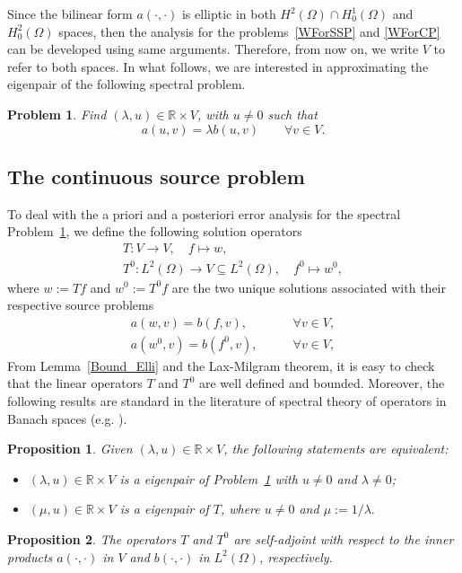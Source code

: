\documentclass[final,reqno]{elsarticle}
\newtheorem{proposition}{Proposition}[section]
\newtheorem{problem}{Problem}
\def\R{\mathbb{R}}
\def\R{\mathbb{R}}
\newcommand{\aer}[1]{{\leavevmode\color{magenta}{#1}}}
\begin{document}
Since the bilinear form $a(\cdot,\cdot)$ is elliptic in both $H^2(\Omega)\cap H_0^1(\Omega)$ and $H_0^2(\Omega)$ spaces, then the analysis for the  problems~\eqref{WForSSP} and \eqref{WForCP} can be developed using same arguments. Therefore, from now on, we write $V$ to refer to both spaces. In what follows, we are interested in approximating the eigenpair of the following spectral problem.
%
%
\begin{problem}\label{WMPr} 
Find $(\lambda,u)\in \mathbb{R}\times V$, with $u\neq 0$ such that
\begin{equation*}
    a(u,v)=\lambda b(u,v)\qquad \forall v\in V.
\end{equation*}
\end{problem}
%
\subsection{The continuous source problem}\label{sec:contSolOp}
To deal with the a priori and a posteriori error analysis for the spectral  Problem~\ref{WMPr}, we define the following solution operators 
\begin{gather*}
T:V \rightarrow  V,
\quad  f \longmapsto w,\\
T^0:L^2(\Omega) \rightarrow  V\subseteq L^2(\Omega),
\quad f^0 \longmapsto w^0,
\end{gather*}
%
%
where $w:=Tf$ and $w^0:=T^0f$ are the two  unique solutions associated with their respective source problems
\begin{align}
a( w ,v)=b(f,v),\qquad&\forall v\in V,    \label{ContSourGPr}\\
a( w^0 ,v)=b(f^0,v),\qquad&\forall v\in V, \label{ContSourGPr0}
\end{align}
From Lemma~\ref{Bound_Elli} and the Lax-Milgram theorem, it is easy to check that the linear operators $T$ and $T^0$ are well defined and bounded. Moreover, the following results are standard in the literature of spectral theory of operators in Banach spaces (e.g. \cite{BO}).
\begin{proposition}
Given $(\lambda,u)\in\R\times V$, the following statements are equivalent:
\begin{itemize}
\item $(\lambda,u)\in\R\times V$ is a eigenpair of Problem~\ref{WMPr} with $u\neq 0$ and $\lambda\neq 0$;
\item $(\mu, u)\in\R\times V$ is a eigenpair of $T$, where $u\neq 0$ and $\mu:=1/\lambda.$
\end{itemize}
\end{proposition}
%
%
\begin{proposition}
The operators $T$ and $T^0$ are self-adjoint with respect to the inner products $a(\cdot,\cdot)$ in $V$ and $b(\cdot,\cdot)$ in $L^2(\Omega)$, respectively.
\label{prop:adjCont}
\end{proposition}
\end{document}

